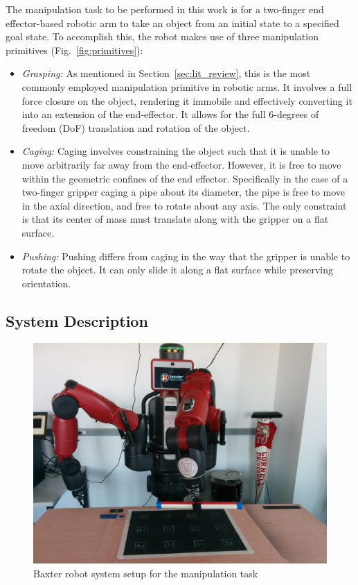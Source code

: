\documentclass[runningheads,letterpaper]{llncs}
\begin{document}
The manipulation task to be performed in this work is for a two-finger end effector-based robotic arm to take an object from an initial state to a specified goal state. To accomplish this, the robot makes use of three manipulation primitives (Fig.~\ref{fig:primitives}):
\begin{itemize}

\item \textit{Grasping:} As mentioned in Section~\ref{sec:lit_review}, this is the most commonly employed manipulation primitive in robotic arms. It involves a full force closure on the object, rendering it immobile and effectively converting it into an extension of the end-effector. It allows for the full 6-degrees of freedom (DoF) translation and rotation of the object.  

\item \textit{Caging:} Caging involves constraining the object such that it is unable to move arbitrarily far away from the end-effector. However, it is free to move within the geometric confines of the end effector. Specifically in the case of a two-finger gripper caging a pipe about its diameter, the pipe is free to move in the axial direction, and free to rotate about any axis. The only constraint is that its center of mass must translate along with the gripper on a flat surface.

\item \textit{Pushing:} Pushing differs from caging in the way that the gripper is unable to rotate the object. It can only slide it along a flat surface while preserving orientation.   
\end{itemize}

\subsection{System Description}
\begin{figure}
\centering
	\includegraphics[width=0.9\columnwidth]{images/baxter.jpg}
\caption{Baxter robot system setup for the manipulation task}
\label{fig:system}
\end{figure}
\end{document}
